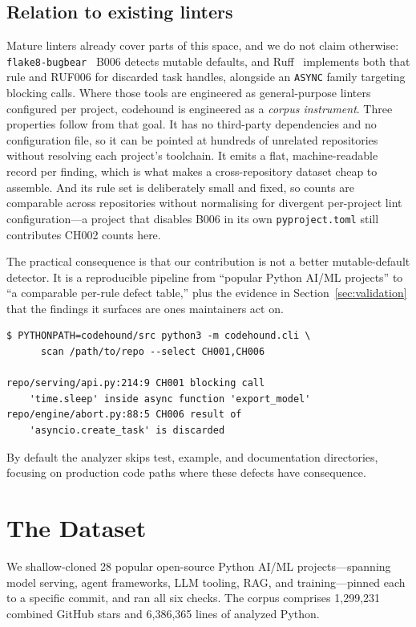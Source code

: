 \documentclass[conference]{IEEEtran}
\begin{document}
\subsection{Relation to existing linters}
Mature linters already cover parts of this space, and we do not claim otherwise: \texttt{flake8-bugbear}~\cite{bugbear} B006 detects mutable defaults, and Ruff~\cite{ruff} implements both that rule and RUF006 for discarded task handles, alongside an \texttt{ASYNC} family targeting blocking calls. Where those tools are engineered as general-purpose linters configured per project, codehound is engineered as a \emph{corpus instrument}. Three properties follow from that goal. It has no third-party dependencies and no configuration file, so it can be pointed at hundreds of unrelated repositories without resolving each project's toolchain. It emits a flat, machine-readable record per finding, which is what makes a cross-repository dataset cheap to assemble. And its rule set is deliberately small and fixed, so counts are comparable across repositories without normalising for divergent per-project lint configuration---a project that disables B006 in its own \texttt{pyproject.toml} still contributes CH002 counts here.

The practical consequence is that our contribution is not a better mutable-default detector. It is a reproducible pipeline from ``popular Python AI/ML projects'' to ``a comparable per-rule defect table,'' plus the evidence in Section~\ref{sec:validation} that the findings it surfaces are ones maintainers act on.

\begin{lstlisting}[caption={Scanning a repository for two rule classes.}]
$ PYTHONPATH=codehound/src python3 -m codehound.cli \
      scan /path/to/repo --select CH001,CH006

repo/serving/api.py:214:9 CH001 blocking call
    'time.sleep' inside async function 'export_model'
repo/engine/abort.py:88:5 CH006 result of
    'asyncio.create_task' is discarded
\end{lstlisting}

By default the analyzer skips test, example, and documentation directories, focusing on production code paths where these defects have consequence.

\section{The Dataset}
\label{sec:dataset}
We shallow-cloned 28 popular open-source Python AI/ML projects---spanning model serving, agent frameworks, LLM tooling, RAG, and training---pinned each to a specific commit, and ran all six checks. The corpus comprises 1{,}299{,}231 combined GitHub stars and 6{,}386{,}365 lines of analyzed Python.
\end{document}
